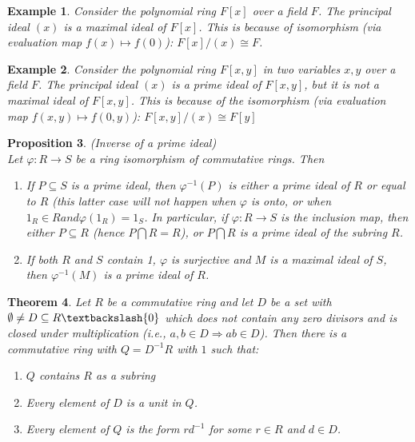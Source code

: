 \documentclass[a4paper,8pt]{article}
\theoremstyle{theorem}
\newtheorem{theorem}{Theorem}[subsection]
\newtheorem{proposition}[theorem]{Proposition}
\newtheorem{example}[theorem]{Example}
\begin{document}
\begin{example}
Consider the polynomial ring $F[x]$ over a field $F$. The principal ideal $(x)$ is a maximal ideal of $F[x]$.
This is because of isomorphism (via evaluation map $f(x) \mapsto f(0)$): $F[x]/(x) \cong F$.
\end{example}


\begin{example}
Consider the polynomial ring $F[x,y]$ in two variables $x,y$ over a field $F$. The principal ideal $(x)$ is a prime ideal of $F[x,y]$, but it is not a maximal ideal of $F[x,y]$. This is because of the isomorphism (via evaluation map $f(x,y) \mapsto f(0,y)$): $F[x,y]/(x) \cong F[y]$
\end{example}


\begin{proposition}
\textit{{\color{blue} (Inverse of a prime ideal)}}\\
Let $\varphi: R \rightarrow S$ be a ring isomorphism of commutative rings. Then
\begin{enumerate}[label=(\roman*)]
\item If $P \subseteq S$ is a prime ideal, then $\varphi^{-1}(P)$ is either a prime ideal of $R$ or equal to $R$ (this latter case will not happen when $\varphi$ is onto, or when $1_R \in R and \varphi(1_R) = 1_S$. In particular, if $\varphi : R \rightarrow S$ is the inclusion map, then either $P \subseteq R$ (hence $P \bigcap R = R$), or $P \bigcap R$ is a prime ideal of the subring $R$.
\item If both $R$ and $S$ contain 1, $\varphi$ is surjective and $M$ is a maximal ideal of $S$, then $\varphi^{-1}(M)$ is a prime ideal of $R$.
\end{enumerate}
\end{proposition}


\begin{theorem}
Let $R$ be a commutative ring and let $D$ be a set with $\emptyset \neq D \subseteq R \textbackslash \{0\}$ which does not contain any zero divisors and is closed under multiplication (i.e., $a, b \in D \Rightarrow ab \in D$). Then there is a commutative ring with $Q = D^{-1}R$ with $1$ such that:
\begin{enumerate}[label=(\roman*)]
\item $Q$ contains $R$ as a subring
\item Every element of $D$ is a unit in $Q$.
\item Every element of $Q$ is the form $r d^{-1}$ for some $r \in R$ and $d \in D$.
\end{enumerate}
\end{theorem}
\end{document}
